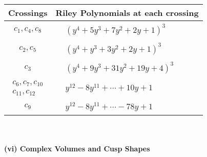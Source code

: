 \documentclass[1p]{elsarticle_modified}
\theoremstyle{definition}
\begin{document}
\begin{tabular}{m{50pt}|m{274pt}}
Crossings & \hspace{64pt}Riley Polynomials at each crossing \\
\hline $$\begin{aligned}c_{1},c_{4},c_{8}\end{aligned}$$&$\begin{aligned}
&(y^4+5 y^3+7 y^2+2 y+1)^3
\end{aligned}$\\
\hline $$\begin{aligned}c_{2},c_{5}\end{aligned}$$&$\begin{aligned}
&(y^4+y^3+3 y^2+2 y+1)^3
\end{aligned}$\\
\hline $$\begin{aligned}c_{3}\end{aligned}$$&$\begin{aligned}
&(y^4+9 y^3+31 y^2+19 y+4)^3
\end{aligned}$\\
\hline $$\begin{aligned}c_{6},c_{7},c_{10}\\c_{11},c_{12}\end{aligned}$$&$\begin{aligned}
&y^{12}-8 y^{11}+\cdots+10 y+1
\end{aligned}$\\
\hline $$\begin{aligned}c_{9}\end{aligned}$$&$\begin{aligned}
&y^{12}-8 y^{11}+\cdots-78 y+1
\end{aligned}$\\
\hline
\end{tabular}\\~\\
\newpage\flushleft \textbf{(vi) Complex Volumes and Cusp Shapes}
\end{document}
